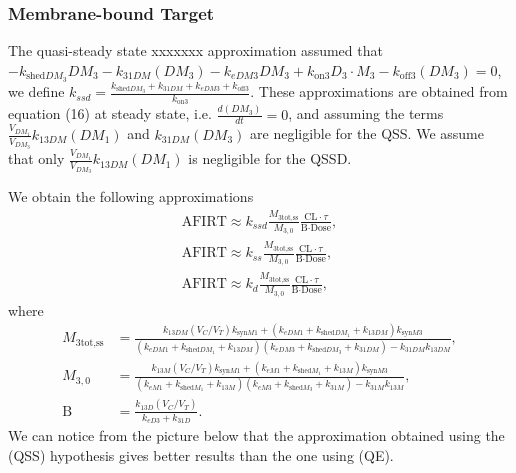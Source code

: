 \subsubsection{Membrane-bound Target}

The quasi-steady state xxxxxxx approximation assumed that $-k_{\text{shed}DM_3}DM_3-k_{31DM}(DM_3) - k_{eDM3}DM_3+k_{\text{on}3}D_3 \cdot M_3 - k_{\text{off}3}(DM_3) = 0 $, we define $k_{ssd}=\frac{k_{\text{shed}DM_3} +k_{31DM}+ k_{eDM3}+ k_{\text{off}3}}{k_{\text{on}3}}$. 
These approximations are obtained from equation (16) at steady state, i.e. $\frac{d(DM_3)}{dt}=0$, and assuming the terms $ \frac{V_{DM_1}}{V_{DM_3}}k_{13DM}(DM_1)$ and $ k_{31DM}(DM_3) $ are negligible for the QSS. We assume that only $\frac{V_{DM_1}}{V_{DM_3}}k_{13DM}(DM_1)$ is negligible for the QSSD. 

We obtain the following approximations 
\begin{align*}
\text{AFIRT} \approx k_{ssd}\frac{M_{3\text{tot,ss}}}{M_{3,0}}\frac{\text{CL}\cdot\tau}{\text{B}\cdot\text{Dose}},\\
\text{AFIRT} \approx k_{ss}\frac{M_{3\text{tot,ss}}}{M_{3,0}}\frac{\text{CL}\cdot\tau}{\text{B}\cdot\text{Dose}},\\
\text{AFIRT} \approx k_{d}\frac{M_{3\text{tot,ss}}}{M_{3,0}}\frac{\text{CL}\cdot\tau}{\text{B}\cdot\text{Dose}},
\end{align*}  
where 
\begin{align*}
M_{3\text{tot,ss}}&=\frac{k_{13DM}(V_C/V_T)k_{\text{syn}M1}+(k_{eDM1}+k_{\text{shed}DM_1}+k_{13DM})k_{\text{syn}M3}}{(k_{eDM1}+k_{\text{shed}DM_1}+k_{13DM})(k_{eDM3}+k_{\text{shed}DM_3}+k_{31DM})-k_{31DM}k_{13DM}},\\
M_{3,0}&=\frac{k_{13M}(V_C/V_T)k_{\text{syn}M1}+(k_{eM1}+k_{\text{shed}M_1}+k_{13M})k_{\text{syn}M3}}{(k_{eM1}+k_{\text{shed}M_1}+k_{13M})(k_{eM3}+k_{\text{shed}M_3}+k_{31M})-k_{31M}k_{13M}},\\
\text{B}&=\frac{k_{13D}(V_C/V_T)}{k_{eD3}+k_{31D}}.
\end{align*}
We can notice from the picture below that the approximation obtained using the (QSS) hypothesis gives better results than the one using (QE).

